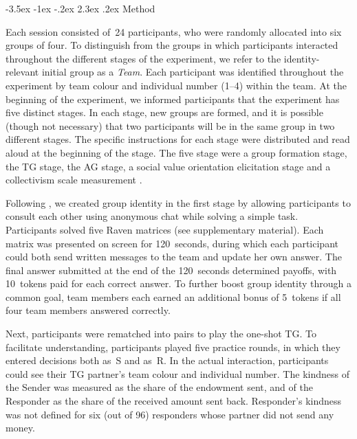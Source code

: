\documentclass[12pt,a4paper]{article}
\makeatletter
\renewcommand\section{\@startsection {section}{1}{\z@}%
{-3.5ex \@plus -1ex \@minus -.2ex}%
{2.3ex \@plus.2ex}%
{\bf\sffamily\Large}}
\makeatother
\begin{document}
\section{Method}
\label{sec:design}

Each session consisted of~24 participants, who were randomly allocated
into six groups of four. To distinguish from the groups in which participants
interacted throughout the different stages of the experiment, we refer
to the identity-relevant initial group as a \emph{Team}. Each participant
was identified throughout the experiment by team colour and individual
number (1--4) within the team. At the beginning of the experiment,
we informed participants that the experiment has five distinct stages.
In each stage, new groups are formed, and it is possible (though not
necessary) that two participants will be in the same group in two
different stages. The specific instructions for each stage were distributed
and read aloud at the beginning of the stage. The five stage were
a group formation stage, the TG stage, the AG stage, a social value
orientation elicitation \citep*{murphy2011measuring} stage and a
collectivism scale measurement \citep*[adapted from the horizontal collectivism scale in]{Singelis1995horizontal}.

Following \citet*{chen2009group}, we created group identity in the
first stage by allowing participants to consult each other using anonymous
chat while solving a simple task. Participants solved five Raven matrices
(see supplementary material). Each matrix was presented on screen
for 120~seconds, during which each participant could both send written
messages to the team and update her own answer. The final answer submitted
at the end of the 120~seconds determined payoffs, with 10~tokens
paid for each correct answer. To further boost group identity through
a common goal, team members each earned an additional bonus of 5~tokens
if all four team members answered correctly.

Next, participants were rematched into pairs to play the one-shot
TG. To facilitate understanding, participants played five practice
rounds, in which they entered decisions both as~S and as~R. In the
actual interaction, participants could see their TG partner's team
colour and individual number. The kindness of the Sender was measured
as the share of the endowment sent, and of the Responder as the share
of the received amount sent back. Responder's kindness was not defined
for six (out of 96) responders whose partner did not send any money.
\end{document}
